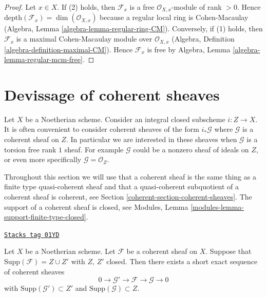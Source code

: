 \begin{proof}
Let $x \in X$. If (2) holds, then $\mathcal{F}_x$ is a free
$\mathcal{O}_{X, x}$-module of rank $> 0$. Hence
$\text{depth}(\mathcal{F}_x) = \dim(\mathcal{O}_{X, x})$
because a regular local ring is Cohen-Macaulay
(Algebra, Lemma \ref{algebra-lemma-regular-ring-CM}).
Conversely, if (1) holds, then $\mathcal{F}_x$ is a
maximal Cohen-Macaulay module over $\mathcal{O}_{X, x}$
(Algebra, Definition \ref{algebra-definition-maximal-CM}).
Hence $\mathcal{F}_x$ is free by
Algebra, Lemma \ref{algebra-lemma-regular-mcm-free}.
\end{proof}

\section{Devissage of coherent sheaves}
\label{coherent-section-devissage}
Let $X$ be a Noetherian scheme. Consider an integral closed subscheme
$i : Z \to X$. It is often convenient to consider coherent sheaves of
the form $i_*\mathcal{G}$ where $\mathcal{G}$ is a coherent sheaf on
$Z$. In particular we are interested in these sheaves when $\mathcal{G}$
is a torsion free rank $1$ sheaf. For example $\mathcal{G}$ could be
a nonzero sheaf of ideals on $Z$, or even more specifically
$\mathcal{G} = \mathcal{O}_Z$.

\medskip\noindent
Throughout this section we will use that a coherent sheaf is the
same thing as a finite type quasi-coherent sheaf and that a
quasi-coherent subquotient of a coherent sheaf is coherent, see
Section \ref{coherent-section-coherent-sheaves}.
The support of a coherent sheaf is closed, see
Modules, Lemma \ref{modules-lemma-support-finite-type-closed}.

\begin{lemma}
\label{coherent-lemma-prepare-filter-support}
\href{https://stacks.math.columbia.edu/tag/01YD}{\texttt{Stacks tag 01YD}}

Let $X$ be a Noetherian scheme.
Let $\mathcal{F}$ be a coherent sheaf on $X$.
Suppose that $\text{Supp}(\mathcal{F}) = Z \cup Z'$ with $Z$, $Z'$ closed.
Then there exists a short exact sequence of coherent sheaves
$$
0 \to \mathcal{G}' \to \mathcal{F} \to \mathcal{G} \to 0
$$
with $\text{Supp}(\mathcal{G}') \subset Z'$ and
$\text{Supp}(\mathcal{G}) \subset Z$.
\end{lemma}

